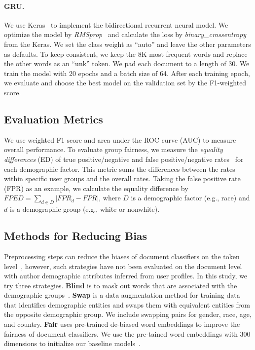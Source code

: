\paragraph{GRU.} We use Keras~\cite{chollet2015keras} to implement the bidirectional recurrent neural model. 
We optimize the model by \textit{RMSprop}~\cite{tieleman2012lecture} and calculate the loss by \textit{binary\_crossentropy} from the Keras.
We set the class weight as ``auto'' and leave the other parameters as defaults.
To keep consistent, we keep the 8K most frequent words and replace the other words as an ``unk'' token.
We pad each document to a length of 30.
We train the model with 20 epochs and a batch size of 64. 
After each training epoch, we evaluate and choose the best model on the validation set by the F1-weighted score.


\subsection{Evaluation Metrics}

We use weighted F1 score and area under the ROC curve (AUC) to measure overall performance.
To evaluate {group fairness},
we measure the \textit{equality differences} (ED) of true positive/negative and false positive/negative rates~\cite{dixon2018measuring,park2018reducing,garg2019counterfactual} for each demographic factor. 
This metric sums the differences between the rates within specific user groups and the overall rates.
Taking the false positive rate (FPR) as an example, we calculate the equality difference by $FPED = \sum_{d \in D}|FPR_d - FPR|$, where $D$ is a demographic factor (e.g., race) and $d$ is a demographic group (e.g., white or nonwhite).




\subsection{Methods for Reducing Bias}
Preprocessing steps can reduce the biases of document classifiers on the token level~\cite{dixon2018measuring,park2018reducing,garg2019counterfactual}, however, such strategies have not been evaluated on the document level with author demographic attributes inferred from user profiles.
In this study, we try three strategies. %
\textbf{Blind} is to mask out words that are associated with the demographic groups~\cite{garg2019counterfactual}.
\textbf{Swap} is a data augmentation method for training data that identifies demographic entities and swaps them with equivalent entities from the opposite demographic group. We include swapping pairs for gender, race, age, and country.
\textbf{Fair} uses pre-trained de-biased word embeddings to improve the fairness of document classifiers. 
We use the pre-tained word embeddings with 300 dimensions to initialize our baseline models~\cite{bolukbasi2016man}.


